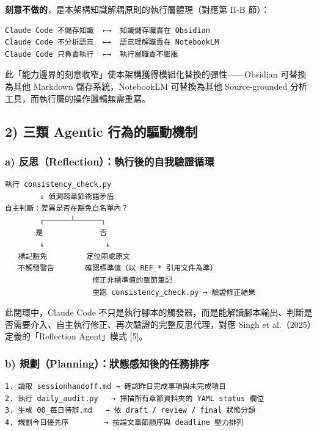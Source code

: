 \textbf{刻意不做的}，是本架構知識解耦原則的執行層體現（對應第 II-B
節）：

\begin{verbatim}
Claude Code 不儲存知識  ←→  知識儲存職責在 Obsidian
Claude Code 不分析語意  ←→  語意理解職責在 NotebookLM
Claude Code 只負責執行  ←→  執行層職責不膨脹
\end{verbatim}

此「能力邊界的刻意收窄」使本架構獲得模組化替換的彈性------Obsidian
可替換為其他 Markdown 儲存系統，NotebookLM 可替換為其他 Source-grounded
分析工具，而執行層的操作邏輯無需重寫。

\subsection{2) 三類 Agentic
行為的驅動機制}\label{ux4e09ux985e-agentic-ux884cux70baux7684ux9a45ux52d5ux6a5fux5236}

\subsubsection{a)
反思（Reflection）：執行後的自我驗證循環}\label{a-ux53cdux601dreflectionux57f7ux884cux5f8cux7684ux81eaux6211ux9a57ux8b49ux5faaux74b0}

\begin{verbatim}
執行 consistency_check.py
        ↓ 偵測跨章節術語矛盾
自主判斷：差異是否在豁免白名單內？
        ┌──────┴──────┐
       是             否
        ↓              ↓
   標記豁免         定位兩處原文
   不觸發警告       確認標準值（以 REF_* 引用文件為準）
                    修正非標準值的章節筆記
                    重跑 consistency_check.py → 驗證修正結果
\end{verbatim}

此閉環中，Claude Code
不只是執行腳本的觸發器，而是能解讀腳本輸出、判斷是否需要介入、自主執行修正、再次驗證的完整反思代理，對應
Singh et al.（2025）定義的「Reflection Agent」模式 {[}5{]}。

\subsubsection{b)
規劃（Planning）：狀態感知後的任務排序}\label{b-ux898fux5283planningux72c0ux614bux611fux77e5ux5f8cux7684ux4efbux52d9ux6392ux5e8f}

\begin{verbatim}
1. 讀取 sessionhandoff.md → 確認昨日完成事項與未完成項目
2. 執行 daily_audit.py   → 掃描所有章節資料夾的 YAML status 欄位
3. 生成 00_每日待辦.md   → 依 draft / review / final 狀態分類
4. 規劃今日優先序        → 按論文章節順序與 deadline 壓力排列
\end{verbatim}

